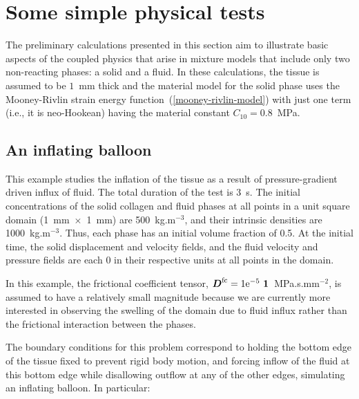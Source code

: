\section{Some simple physical tests}
\label{simple-physics}

The preliminary calculations presented in this section aim to
illustrate basic aspects of the coupled physics that arise in mixture
models that include only two non-reacting phases: a solid and a
fluid. In these calculations, the tissue is assumed to be $1$~mm thick
and the material model for the solid phase uses the Mooney-Rivlin
strain energy function~(\ref{mooney-rivlin-model}) with just one term
(i.e., it is neo-Hookean) having the material constant \mbox{$C_{10} =
  0.8$~MPa.}

\subsection{An inflating balloon}
\label{balloon}

This example studies the inflation of the tissue as a result of
pressure-gradient driven influx of fluid.  The total duration of the
test is 3~s. The initial concentrations of the solid collagen and
fluid phases at all points in a unit square domain \mbox{(1~mm
  $\times$ 1~mm)} are 500~kg.m$^{-3}$, and their intrinsic densities
are 1000~kg.m$^{-3}$. Thus, each phase has an initial volume fraction
of 0.5. At the initial time, the solid displacement and velocity
fields, and the fluid velocity and pressure fields are each 0 in their
respective units at all points in the domain.

In this example, the frictional coefficient tensor, $\bD^{\mathrm{fc}}
= 1\mathrm{e}^{-5} \ \bone$~MPa.s.mm$^{-2}$, is assumed to have a
relatively small magnitude because we are currently more interested in
observing the swelling of the domain due to fluid influx rather than
the frictional interaction between the phases.

The boundary conditions for this problem correspond to holding the
bottom edge of the tissue fixed to prevent rigid body motion, and
forcing inflow of the fluid at this bottom edge while disallowing
outflow at any of the other edges, simulating an inflating balloon. In
particular:

